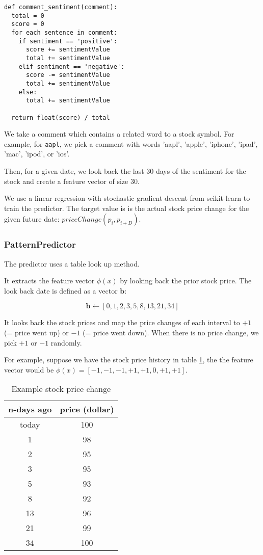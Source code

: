\documentclass[twocolumn,10pt]{asme2ej}
\newcommand{\vect}[1]{\boldsymbol{#1}}
\begin{document}
\begin{verbatim}
def comment_sentiment(comment):
  total = 0
  score = 0
  for each sentence in comment:
    if sentiment == 'positive':
      score += sentimentValue
      total += sentimentValue
    elif sentiment == 'negative':
      score -= sentimentValue
      total += sentimentValue
    else:
      total += sentimentValue

  return float(score) / total
\end{verbatim}

We take a comment which contains a related word to a stock symbol. For
example, for \verb|aapl|, we pick a comment with words 'aapl',
'apple', 'iphone', 'ipad', 'mac', 'ipod', or 'ios'.

Then, for a given date, we look back the last 30 days of the sentiment
for the stock and create a feature vector of size 30.

We use a linear regression with stochastic gradient descent from
scikit-learn \cite{web:scikit_learn} to train the predictor. The
target value is is the actual stock price change for the given future
date: $priceChange(p_i, p_{i+D})$.

\subsubsection{PatternPredictor}

The predictor uses a table look up method.

It extracts the feature vector $\phi(x)$ by looking back the prior
stock price. The look back date is defined as a vector $\vect{b}$:

\[
\vect{b} \gets [0, 1, 2, 3, 5, 8, 13, 21, 34]
\]

It looks back the stock prices and map the price changes of each
interval to $+1$ (= price went up) or $-1$ (= price went down). When
there is no price change, we pick $+1$ or $-1$ randomly.

For example, suppose we have the stock price history in table
\ref{patternStockExample}, the the feature vector would be
$\phi(x)=[-1,-1,-1,+1,+1,0,+1,+1]$.

\begin{table}
  \begin{tabular}{cc}
    n-days ago & price (dollar) \\
    \hline
    today & 100 \\
    1 & 98 \\
    2 & 95 \\
    3 & 95 \\
    5 & 93 \\
    8 & 92 \\
    13 & 96 \\
    21 & 99 \\
    34 & 100 \\
  \end{tabular}
  \caption{Example stock price change}
  \label{patternStockExample}
\end{table}
\end{document}
